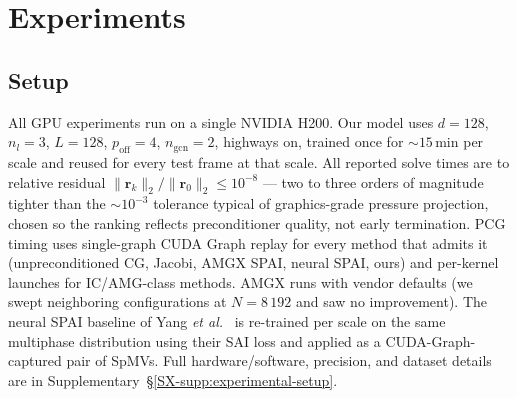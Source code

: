 \documentclass[acmtog,anonymous,review]{acmart}
\theoremstyle{plain}
\begin{document}
\section{Experiments}
\label{sec:results}

\subsection{Setup}
\label{sec:results:setup}

All GPU experiments run on a single NVIDIA H200. Our model uses $d\!=\!128$,
$n_l\!=\!3$, $L\!=\!128$, $p_{\mathrm{off}}\!=\!4$, $n_{\mathrm{gcn}}\!=\!2$, highways
on, trained once for $\sim\!15$\,min per scale and reused for every test frame at that
scale. All reported solve times are to relative residual
$\|\mathbf{r}_k\|_2/\|\mathbf{r}_0\|_2\!\le\!10^{-8}$ --- two to three orders of
magnitude tighter than the $\sim\!10^{-3}$ tolerance typical of graphics-grade pressure
projection, chosen so the ranking reflects preconditioner quality, not early
termination. PCG timing uses single-graph CUDA Graph replay for every method that
admits it (unpreconditioned CG, Jacobi, AMGX SPAI, neural SPAI, ours) and per-kernel
launches for IC/AMG-class methods. AMGX runs with vendor defaults (we swept neighboring
configurations at $N\!=\!8\,192$ and saw no improvement). The neural SPAI baseline of
Yang \emph{et al.}~\cite{Yang2025sparse} is re-trained per scale on the same multiphase
distribution using their SAI loss and applied as a CUDA-Graph-captured pair of SpMVs.
Full hardware/software, precision, and dataset details are in Supplementary~\S\ref{SX-supp:experimental-setup}.
\end{document}
